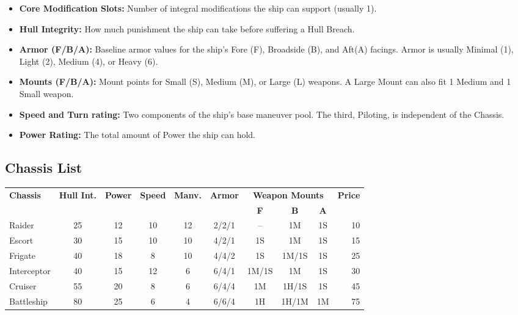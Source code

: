 \begin{itemize}
    \item \textbf{Core Modification Slots:} Number of integral modifications the ship can support (usually 1).
    \item \textbf{Hull Integrity:} How much punishment the ship can take before suffering a Hull Breach.
    \item \textbf{Armor (F/B/A):} Baseline armor values for the ship's Fore (F), Broadside (B), and Aft(A) facings. Armor is usually Minimal (1), Light (2), Medium (4), or Heavy (6).
    \item \textbf{Mounts (F/B/A):} Mount points for Small (S), Medium (M), or Large (L) weapons. A Large Mount can also fit 1 Medium and 1 Small weapon.
	\item \textbf{Speed and Turn rating:} Two components of the ship's base maneuver pool. The third, Piloting, is independent of the Chassis.
    \item \textbf{Power Rating:} The total amount of Power the ship can hold.
\end{itemize}

\subsection{Chassis List}

\begin{center}
\begin{tabular}{|l|c|c|c|c|c|*{3}{c|}r|}
\hline
\textbf{Chassis} & \textbf{Hull Int.} & \textbf{Power} & \textbf{Speed} & \textbf{Manv.} & \textbf{Armor} 
& \multicolumn{3}{c|}{\textbf{Weapon Mounts}} & \textbf{Price} \\
\cline{7-9}
 & & & & & & \textbf{F} & \textbf{B} & \textbf{A} & \\
\hline
Raider 		& 25 	& 12 	& 10 	& 12 	& 2/2/1 & -- 	& 1M 	& 1S 	& 10 \\
Escort 		& 30 	& 15 	& 10 	& 10 	& 4/2/1 & 1S 	& 1M 	& 1S	& 15 \\
Frigate 	& 40 	& 18 	& 8 	& 10 	& 4/4/2 & 1S 	& 1M/1S	& 1S	& 25 \\
Interceptor & 40 	& 15 	& 12 	& 6 	& 6/4/1 & 1M/1S	& 1M 	& 1S	& 30 \\
Cruiser 	& 55 	& 20 	& 8 	& 6 	& 6/4/4 & 1M 	& 1H/1S	& 1S	& 45 \\
Battleship 	& 80 	& 25 	& 6 	& 4 	& 6/6/4 & 1H 	& 1H/1M	& 1M	& 75 \\
\hline
\end{tabular}
\end{center}


